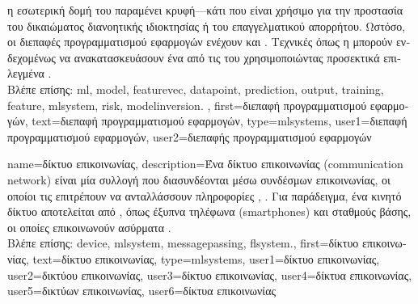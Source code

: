 {{{		η εσωτερική δομή του}  \foreignlanguage{greek}{παραμένει κρυφή—κάτι που είναι χρήσιμο για την προστασία του
		δικαιώματος διανοητικής ιδιοκτησίας ή του επαγγελματικού απορρήτου. Ωστόσο, οι διεπαφές προγραμματι\-σμού εφαρμογών ενέχουν και}
		. \foreignlanguage{greek}{Τεχνικές όπως η}  \foreignlanguage{greek}{μπορούν ενδεχομένως 
		να ανακατασκευάσουν ένα}  \foreignlanguage{greek}{από τις}  \foreignlanguage{greek}{του 
		χρησιμοποιώντας προσεκτικά επιλεγμένα} .
			\\
		\foreignlanguage{greek}{Βλέπε επίσης:} \gls{ml}, \gls{model}, \gls{featurevec}, \gls{datapoint}, \gls{prediction}, \gls{output}, \gls{training}, \gls{feature}, 
		\gls{mlsystem}, \gls{risk}, \gls{modelinversion}. },
	first={\foreignlanguage{greek}{διεπαφή προγραμματισμού εφαρμογών}},
	text={\foreignlanguage{greek}{διεπαφή προγραμματισμού εφαρμογών}},
	type=mlsystems,
	user1={\foreignlanguage{greek}{διεπαφή προγραμματισμού εφαρμογών}}, %
	user2={\foreignlanguage{greek}{διεπαφής προγραμματισμού εφαρμογών}} %
}

{name={\foreignlanguage{greek}{δίκτυο επικοινωνίας}},
	description={\foreignlanguage{greek}{Ένα δίκτυο επικοινωνίας} (communication network) 
		\foreignlanguage{greek}{είναι μία συλλογή}  \foreignlanguage{greek}{που διασυνδέονται μέσω συνδέσμων επικοινωνίας, 
		οι οποίοι τις επιτρέπουν να ανταλλάσσουν πληροφορίες} \cite{DistributedSystems}, \cite{TanenbaumComputerNet}. \foreignlanguage{greek}{Για 
		παράδειγμα, ένα κινητό δίκτυο αποτελείται από} , \foreignlanguage{greek}{όπως έξυπνα τηλέφωνα} 
		(smartphones) \foreignlanguage{greek}{και σταθμούς βάσης, οι οποίες επικοινωνούν ασύρματα} \cite{FundWireless}.
		\\
		\foreignlanguage{greek}{Βλέπε επίσης:} \gls{device}, \gls{mlsystem}, \gls{messagepassing}, \gls{flsystem}.},
	first={\foreignlanguage{greek}{δίκτυο επικοινωνίας}},
	text={\foreignlanguage{greek}{δίκτυο επικοινωνίας}},
	type=mlsystems,
	user1={\foreignlanguage{greek}{δίκτυο επικοινωνίας}}, %
	user2={\foreignlanguage{greek}{δικτύου επικοινωνίας}}, %
	user3={\foreignlanguage{greek}{δίκτυο επικοινωνίας}}, %
	user4={\foreignlanguage{greek}{δίκτυα επικοινωνίας}}, %
	user5={\foreignlanguage{greek}{δικτύων επικοινωνίας}}, %
	user6={\foreignlanguage{greek}{δίκτυα επικοινωνίας}} %
}

